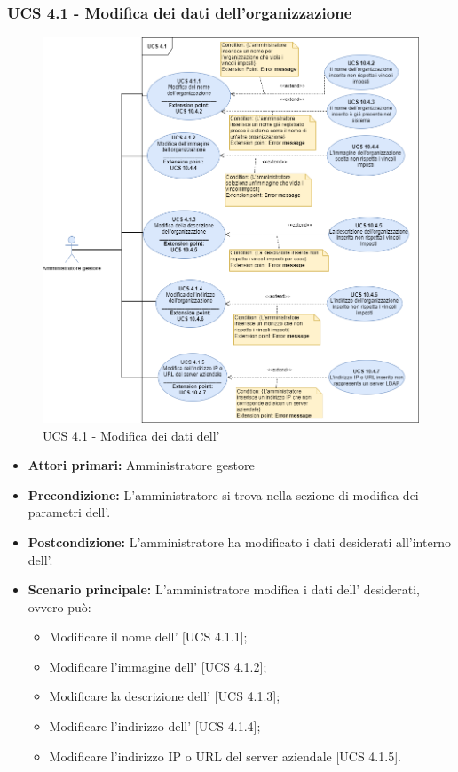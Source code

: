 \subsubsection{UCS 4.1 - Modifica dei dati dell'organizzazione}%
\begin{figure}[h]
	\centering
	\includegraphics[scale=0.53]{Sezioni/UseCase/Immagini/UCS4.1.png}
	\caption{UCS 4.1 - Modifica dei dati dell'}
\end{figure}
\begin{itemize}
	\item \textbf{Attori primari:} Amministratore gestore
	\item \textbf{Precondizione:} L'amministratore si trova nella sezione di modifica dei parametri dell'.
	\item \textbf{Postcondizione:} L'amministratore ha modificato i dati desiderati all'interno dell'.
	\item \textbf{Scenario principale:} L'amministratore modifica i dati dell' desiderati, ovvero può:
	\begin{itemize}
		\item Modificare il nome dell' [UCS 4.1.1];
		\item Modificare l'immagine dell' [UCS 4.1.2];
		\item Modificare la descrizione dell' [UCS 4.1.3];
		\item Modificare l'indirizzo dell' [UCS 4.1.4];
		\item Modificare l'indirizzo IP o URL del server aziendale [UCS 4.1.5].
	\end{itemize}
\end{itemize}

